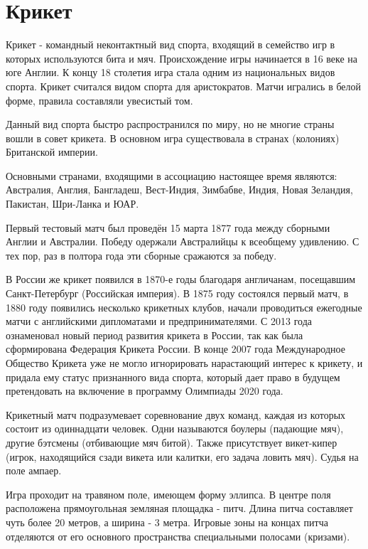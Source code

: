 \section{Крикет}

Крикет - командный неконтактный вид спорта, входящий в семейство игр в которых используются бита и мяч. Происхождение игры начинается в 16 веке на юге Англии. К концу 18 столетия игра стала одним из национальных видов спорта. Крикет считался видом спорта для аристократов. Матчи игрались в белой форме, правила составляли увесистый том.

Данный вид спорта быстро распространился по миру, но не многие страны вошли в совет крикета. В основном игра существовала в странах (колониях) Британской империи.

Основными странами, входящими в ассоциацию настоящее время являются: Австралия, Англия, Бангладеш, Вест-Индия, Зимбабве, Индия, Новая Зеландия, Пакистан, Шри-Ланка и ЮАР.

Первый тестовый матч был проведён 15 марта 1877 года между сборными Англии и Австралии. Победу одержали Австралийцы к всеобщему удивлению. С тех пор, раз в полтора года эти сборные сражаются за победу.

В России же крикет появился в 1870-е годы благодаря англичанам, посещавшим Санкт-Петербург (Российская империя). В 1875 году состоялся первый матч, в 1880 году появились несколько крикетных клубов, начали проводиться ежегодные матчи с английскими дипломатами и предпринимателями. С 2013 года ознаменовал новый период развития крикета в России, так как была сформирована Федерация Крикета России. В конце 2007 года Международное Общество Крикета уже не могло игнорировать нарастающий интерес к крикету, и придала ему статус признанного вида спорта, который дает право в будущем претендовать на включение в программу Олимпиады 2020 года.

Крикетный матч подразумевает соревнование двух команд, каждая из которых состоит из одиннадцати человек. Одни называются боулеры (падающие мяч), другие бэтсмены (отбивающие мяч битой). Также присутствует викет-кипер (игрок, находящийся сзади викета или калитки, его задача ловить мяч). Судья на поле ампаер.

Игра проходит на травяном поле, имеющем форму эллипса. В центре поля расположена прямоугольная земляная площадка - питч. Длина питча составляет чуть более 20 метров, а ширина - 3 метра. Игровые зоны на концах питча отделяются от его основного пространства специальными полосами (кризами).

